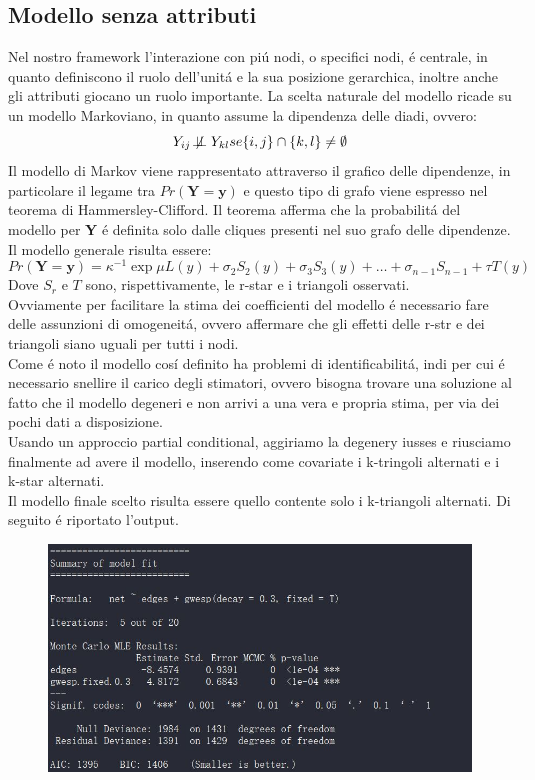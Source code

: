 \documentclass[11pt,a4paper]{report}
\begin{document}
\subsection{Modello senza attributi}
Nel nostro framework l'interazione con pi\'u nodi, o specifici nodi, \'e centrale, in quanto definiscono il ruolo dell'unit\'a e la sua posizione gerarchica, inoltre anche gli attributi giocano un ruolo importante. La scelta naturale del modello ricade su un modello Markoviano, in quanto  assume la dipendenza delle diadi, ovvero:
$$Y_{ij} \not\!\perp\!\!\!\perp Y_{kl} se \{i, j\} \cap \{k, l\} \neq \emptyset $$
Il modello di Markov viene rappresentato attraverso il grafico delle dipendenze, in particolare il legame tra $Pr(\textbf{Y}= \textbf{y})$ e questo tipo di grafo viene espresso nel teorema di Hammersley-Clifford. Il teorema afferma che la probabilit\'a del modello per \textbf{Y} \'e definita solo dalle cliques presenti nel suo grafo delle dipendenze.
\\
Il modello generale risulta essere:
$$
Pr(\textbf{Y} = \textbf{y}) = \kappa^{-1} \exp{\mu L(y) + \sigma_2 S_2 (y)+ \sigma_3 S_3(y)+ \dots + \sigma_{n-1} S_{n-1} + \tau T(y)}
$$
Dove $S_r$ e $T$ sono, rispettivamente, le r-star e i triangoli osservati.
\\
Ovviamente per facilitare la stima dei coefficienti del modello \'e necessario fare delle assunzioni di omogeneit\'a, ovvero affermare che gli effetti delle r-str e dei triangoli siano uguali per tutti i nodi.
\\
Come \'e noto il modello cos\'i definito ha problemi di identificabilit\'a, indi per cui \'e necessario snellire il carico degli stimatori, ovvero bisogna trovare una soluzione al fatto che il modello degeneri e non arrivi a una vera e propria stima, per via dei pochi dati a disposizione.
\\
Usando un approccio partial conditional, aggiriamo la degenery iusses e riusciamo finalmente ad avere il modello, inserendo come covariate  i k-tringoli alternati e i k-star alternati.
\\
Il modello finale scelto risulta essere quello contente solo i k-triangoli alternati. Di seguito \'e riportato l'output.
\begin{figure}[H]
	\centering
	\includegraphics[scale=0.75]{mod1}
\end{figure}
\end{document}
